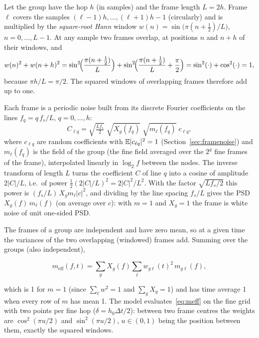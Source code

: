 Let the group have the hop $h$ (in samples) and the frame length $L = 2h$. Frame $\ell$ covers the
samples $(\ell-1)h,\dots,(\ell+1)h-1$ (circularly) and is multiplied by the \emph{square-root Hann}
window $w(n) = \sin\bigl(\pi(n+\tfrac12)/L\bigr)$, $n = 0,\dots,L-1$. At any sample two frames overlap,
at positions $n$ and $n+h$ of their windows, and
\begin{equation}
  w(n)^2 + w(n+h)^2 = \sin^2\!\Bigl(\frac{\pi(n+\frac12)}{L}\Bigr) +
  \sin^2\!\Bigl(\frac{\pi(n+\frac12)}{L}+\frac{\pi}{2}\Bigr)
  = \sin^2(\cdot)+\cos^2(\cdot) = 1,
\end{equation}
because $\pi h/L = \pi/2$. The squared windows of overlapping frames therefore add up to one.

Each frame is a periodic noise built from its discrete Fourier coefficients on the lines $f_q =
q\,f_s/L$, $q = 0,\dots,h$:
\begin{equation}
  C_{\ell q} = \sqrt{\tfrac{Lf_s}{2}}\;\sqrt{X_g(f_q)}\;\sqrt{m_\ell(f_q)}\;c_{\ell q},
\end{equation}
where $c_{\ell q}$ are random coefficients with $\mathbb{E}|c_{\ell q}|^2=1$ (Section~\ref{sec:framenoise}) and
$m_\ell(f_q)$ is the field of the group (the fine field averaged over the $2^g$ fine frames of the
frame), interpolated linearly in $\log_2 f$ between the nodes. The inverse transform of length $L$
turns the coefficient $C$ of line $q$ into a cosine of amplitude $2|C|/L$, i.e.\ of power
$\tfrac12(2|C|/L)^2 = 2|C|^2/L^2$. With the factor $\sqrt{Lf_s/2}$ this power is $(f_s/L)\,X_gm_\ell|c|^2$,
and dividing by the line spacing $f_s/L$ gives the PSD $X_g(f)\,m_\ell(f)$ (on average over $c$):
with $m=1$ and $X_g=1$ the frame is white noise of unit one-sided PSD.

The frames of a group are independent and have zero mean, so at a given time the variances of the
two overlapping (windowed) frames add. Summing over the groups (also independent),
\begin{result}
\begin{equation}\label{eq:meff}
  m_{\mathrm{eff}}(f,t) = \sum_g X_g(f)\sum_\ell w_{g\ell}(t)^2\,m_{g\ell}(f),
\end{equation}
\end{result}
which is 1 for $m=1$ (since $\sum_\ell w^2 = 1$ and $\sum_g X_g = 1$) and has time average 1 when every
row of $m$ has mean 1. The model evaluates~\eqref{eq:meff} on the fine grid with two points per fine
hop ($\delta = h_0\Delta t/2$): between two frame centres the weights are $\cos^2(\pi u/2)$ and
$\sin^2(\pi u/2)$, $u\in(0,1)$ being the position between them, exactly the squared windows.

